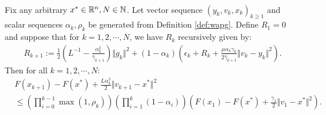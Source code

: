 \documentclass[12pt]{article}
\begin{document}
    \begin{proposition}\label{prop:wagp-convergence}\; \\
        Fix any arbitrary $x^* \in \mathbb R^n, N \in \mathbb N$. 
        Let vector sequence $(y_k, v_{k}, x_{k})_{k \ge 1}$ and scalar sequences $\alpha_k, \rho_k$ be generated from Definition \ref{def:wapg}. 
        Define $R_1 = 0$ and suppose that for $k = 1, 2, \cdots, N$, we have $R_k$ recursively given by: 
        \begin{align*}
            R_{k + 1}
            := 
            \frac{1}{2}\left(
                L^{-1} - \frac{\alpha_k^2}{\hat \gamma_{k + 1}}
            \right)\Vert g_k\Vert^2
            + 
            (1 - \alpha_k)
            \left(
                \epsilon_k + R_k + 
                \frac{\mu\alpha_k\gamma_k}{2\hat \gamma_{k + 1}}
                \Vert v_k - y_k\Vert^2
            \right). 
        \end{align*} 
        Then for all $k = 1, 2, \cdots, N$: 
        \begin{align*}
            & F(x_{k + 1}) - F(x^*) + \frac{L \alpha_k^2}{2}\Vert v_{k + 1} - x^*\Vert^2
            \\
            &\le 
            \left(
                \prod_{i = 0}^{k - 1} \max(1, \rho_{k})
            \right)
            \left(
                \prod_{i = 1}^{k} \left(1  - \alpha_i\right)
            \right)
            \left(
                F(x_1) - F(x^*) + \frac{\gamma_1}{2}\Vert v_1 - x^*\Vert^2
            \right). 
        \end{align*}
    \end{proposition}
\end{document}

